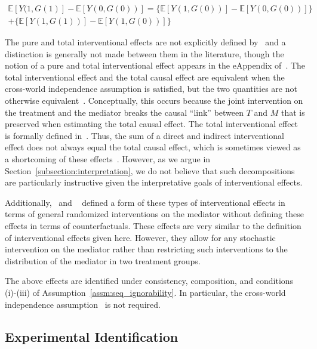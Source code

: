 \begin{equation}
\begin{aligned}
	\mathbb{E}[Y(1,G(1)] - \mathbb{E}[Y(0,G(0))] = 
	\{\mathbb{E}[Y(1,G(0))] - \mathbb{E}[Y(0,G(0))]\}\\ 
	+ \{\mathbb{E}[Y(1,G(1))] - \mathbb{E}[Y(1,G(0))]\}
\end{aligned}
\end{equation}

The pure and total interventional effects are not explicitly defined 
by~\cite{vanderweeleetal2014} and a distinction is generally not made between them in the literature, though 
the notion of a pure and total interventional effect appears in the eAppendix of~\cite{vanderweele2014}. 
The total interventional effect and the total causal effect are equivalent when the cross-world independence
assumption is satisfied, but the two quantities are not otherwise equivalent~\citep{vanderweeleetal2014}.
Conceptually, this occurs because the joint intervention on the treatment and the mediator breaks the 
causal ``link'' between $T$ and $M$ that is preserved when estimating the total causal effect.
The total interventional effect is formally defined in~\cite{linvanderweele2017}. Thus, the 
sum of a direct and indirect interventional effect does not always equal the total causal effect, which 
is sometimes viewed as a shortcoming of these effects~\citep{vansteelandtdaniel2017}. However, as we
argue in Section~\ref{subsection:interpretation}, we do not believe that such decompositions are 
particularly instructive given the interpretative goals of interventional effects. 

Additionally,~\cite{didelez2006} and ~\cite{geneletti2007} defined a form of these types of
interventional effects in terms of general randomized interventions on the mediator without defining these
effects in terms of counterfactuals. These effects are very similar to the definition of interventional effects
given here. However, they allow for any stochastic intervention on the mediator rather than
restricting such interventions to the distribution of the mediator in two treatment groups. 

The above effects are identified under consistency, composition, and conditions (i)-(iii) of 
Assumption~\ref{assm:seq_ignorability}. 
In particular, the cross-world independence assumption~\citep{vanderweeleetal2014} is not required. 

\subsection{Experimental Identification}

